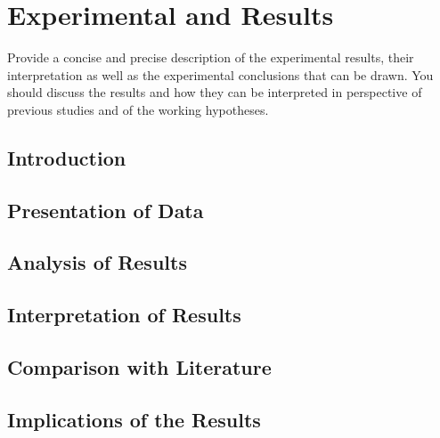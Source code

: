 \chapter{Experimental and Results}
Provide a concise and precise description of the experimental results, their interpretation as well as the experimental conclusions that can be drawn. You should discuss the results and how they can be interpreted in perspective of previous studies and of the working hypotheses. 
\section{Introduction}
\section{Presentation of Data}
\section{Analysis of Results}
\section{Interpretation of Results}
\section{Comparison with Literature}
\section{Implications of the Results}